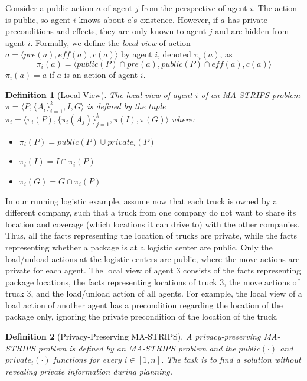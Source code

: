 \documentclass[letterpaper]{article}
\newtheorem{definition}{Definition}
\theoremstyle{definition}
\begin{document}
Consider a public action $a$ of agent $j$ from the perspective of agent $i$. 
The action is public, so agent $i$ knows about $a$'s existence. However, if $a$ has private preconditions and effects, they are only known to agent $j$ and are hidden from agent $i$. Formally, we define the {\em local view} of action $a=\langle pre(a),eff(a),c(a) \rangle$ by agent $i$, denoted $\pi_i(a)$, as 
\[ \pi_i(a)=\langle public(P)\cap pre(a), public(P)\cap eff(a), c(a) \rangle \]
$\pi_i(a)=a$ if $a$ is an action of agent $i$. 



\begin{definition}[Local View]
The {\em local view} of agent $i$ of an MA-STRIPS problem $\pi=\langle  P, \{A_i\}_{i=1}^k, I ,G \rangle$
is defined by the tuple 
$\pi_i=\langle
\pi_i(P), \{\pi_i(A_j)\}_{j=1}^k,\pi(I),\pi(G)
\rangle
$
where:
\begin{itemize}
\item $\pi_i(P)=public(P)\cup private_i(P)$
\item $\pi_i(I)=I \cap \pi_i(P)$
\item $\pi_i(G)=G \cap \pi_i(P)$
\end{itemize}
\label{def:local-view}
\end{definition}



In our running logistic example, assume now that each truck is owned by a different company, such that a truck from one company do not want to share its location and coverage (which locations it can drive to) with the other companies. Thus, all the facts representing the location of trucks are private, while the facts representing whether a package is at a logistic center are public. Only the load/unload actions at the logistic centers are public, where the move actions are private for each agent.  The local view of agent 3 consists of the facts representing package locations, the facts representing locations of truck $3$, the move actions of truck $3$, and the load/unload action of all agents. For example, the local view of a load action of another agent has a precondition regarding the location of the package only, ignoring the private precondition of the location of the truck. 





\begin{definition}[Privacy-Preserving MA-STRIPS]
A privacy-preserving MA-STRIPS problem is defined by an MA-STRIPS problem 
and the $public(\cdot)$ and $private_i(\cdot)$ functions for every $i\in[1,n]$. The task is to find a solution without revealing private information during planning. 
\label{def:private-ma-strips}
\end{definition}
 
\end{document}
